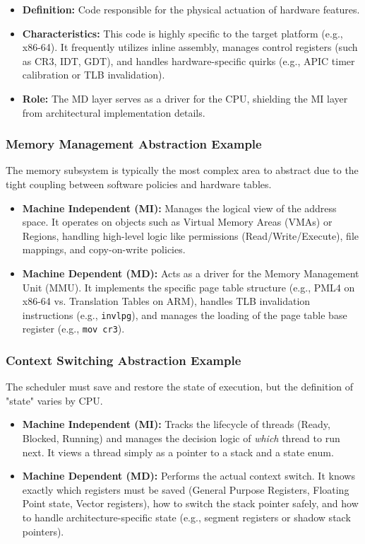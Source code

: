 \documentclass[a4paper,10pt,twoside]{report}
\theoremstyle{definition}
\begin{document}
\begin{itemize}
    \item \textbf{Definition:} Code responsible for the physical actuation of hardware features.
    \item \textbf{Characteristics:} This code is highly specific to the target platform (e.g., x86-64). It frequently utilizes inline assembly, manages control registers (such as CR3, IDT, GDT), and handles hardware-specific quirks (e.g., APIC timer calibration or TLB invalidation).
    \item \textbf{Role:} The MD layer serves as a driver for the CPU, shielding the MI layer from architectural implementation details.
\end{itemize}

\subsubsection{Memory Management Abstraction Example}
The memory subsystem is typically the most complex area to abstract due to the tight coupling between software policies and hardware tables.
\begin{itemize}
    \item \textbf{Machine Independent (MI):} Manages the logical view of the address space. It operates on objects such as Virtual Memory Areas (VMAs) or Regions, handling high-level logic like permissions (Read/Write/Execute), file mappings, and copy-on-write policies.
    \item \textbf{Machine Dependent (MD):} Acts as a driver for the Memory Management Unit (MMU). It implements the specific page table structure (e.g., PML4 on x86-64 vs. Translation Tables on ARM), handles TLB invalidation instructions (e.g., \texttt{invlpg}), and manages the loading of the page table base register (e.g., \texttt{mov cr3}).
\end{itemize}

\subsubsection{Context Switching Abstraction Example}
The scheduler must save and restore the state of execution, but the definition of "state" varies by CPU.
\begin{itemize}
    \item \textbf{Machine Independent (MI):} Tracks the lifecycle of threads (Ready, Blocked, Running) and manages the decision logic of \textit{which} thread to run next. It views a thread simply as a pointer to a stack and a state enum.
    \item \textbf{Machine Dependent (MD):} Performs the actual context switch. It knows exactly which registers must be saved (General Purpose Registers, Floating Point state, Vector registers), how to switch the stack pointer safely, and how to handle architecture-specific state (e.g., segment registers or shadow stack pointers).
\end{itemize}
\end{document}
